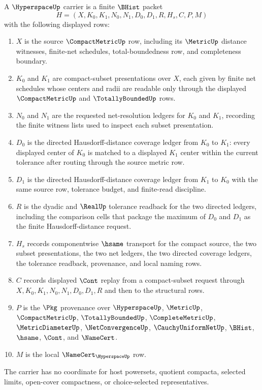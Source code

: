 \begin{definition}
\label{def:hyperspace-carrier}
A $\HyperspaceUp$ carrier is a finite $\BHist$ packet
$$
H=(X,K_0,K_1,N_0,N_1,D_0,D_1,R,H_s,C,P,M)
$$
with the following displayed rows:
\begin{enumerate}
\item $X$ is the source $\CompactMetricUp$ row, including its $\MetricUp$ distance witnesses, finite-net schedules, total-boundedness row, and completeness boundary.
\item $K_0$ and $K_1$ are compact-subset presentations over $X$, each given by finite net schedules whose centers and radii are readable only through the displayed $\CompactMetricUp$ and $\TotallyBoundedUp$ rows.
\item $N_0$ and $N_1$ are the requested net-resolution ledgers for $K_0$ and $K_1$, recording the finite witness lists used to inspect each subset presentation.
\item $D_0$ is the directed Hausdorff-distance coverage ledger from $K_0$ to $K_1$: every displayed center of $K_0$ is matched to a displayed $K_1$ center within the current tolerance after routing through the source metric row.
\item $D_1$ is the directed Hausdorff-distance coverage ledger from $K_1$ to $K_0$ with the same source row, tolerance budget, and finite-read discipline.
\item $R$ is the dyadic and $\RealUp$ tolerance readback for the two directed ledgers, including the comparison cells that package the maximum of $D_0$ and $D_1$ as the finite Hausdorff-distance request.
\item $H_s$ records componentwise $\hsame$ transport for the compact source, the two subset presentations, the two net ledgers, the two directed coverage ledgers, the tolerance readback, provenance, and local naming rows.
\item $C$ records displayed $\Cont$ replay from a compact-subset request through $X,K_0,K_1,N_0,N_1,D_0,D_1,R$ and then to the structural rows.
\item $P$ is the $\Pkg$ provenance over $\HyperspaceUp$, $\MetricUp$, $\CompactMetricUp$, $\TotallyBoundedUp$, $\CompleteMetricUp$, $\MetricDiameterUp$, $\NetConvergenceUp$, $\CauchyUniformNetUp$, $\BHist$, $\hsame$, $\Cont$, and $\NameCert$.
\item $M$ is the local $\NameCert_{\HyperspaceUp}$ row.
\end{enumerate}
The carrier has no coordinate for host powersets, quotient compacta, selected limits, open-cover compactness, or choice-selected representatives.
\end{definition}

